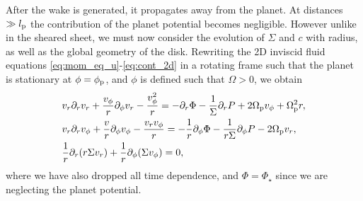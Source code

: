 After the wake is generated, it propagates away from the planet.
At distances $\gg l_{\rm p}$ the contribution of the planet potential becomes negligible.
However unlike in the sheared sheet, we must now consider the evolution of $\Sigma$ and $c$ with radius, as well as the global geometry of the disk.
Rewriting the 2D inviscid fluid equations \ref{eq:mom_eq_u}-\ref{eq:cont_2d} in a rotating frame such that the planet is stationary at $\phi=\phi_{\rm p}$, and $\phi$ is defined such that $\Omega>0$, we obtain \citep{landau1959}
\begin{align}
    &v_r \partial_r v_r + \frac{v_\phi}{r} \partial_\phi v_r - \frac{v_\phi^2}{r} = - \partial_r \Phi - \frac{1}{\Sigma} \partial_r P + 2 \Omega_{\rm p} v_\phi + \Omega_{\rm p}^2 r, \label{eq:mom_eq_u_pl} \\ 
    &v_r \partial_r v_\phi + \frac{v}{r} \partial_\phi v_\phi - \frac{v_r v_\phi}{r} = - \frac{1}{r} \partial_\phi \Phi - \frac{1}{r\Sigma} \partial_\phi P - 2 \Omega_{\rm p} v_r, \label{eq:mom_eq_v_pl} \\
    &\frac{1}{r} \partial_r (r \Sigma v_r) + \frac{1}{r} \partial_\phi (\Sigma v_\phi) = 0,
    \label{eq:cont_2d_pl}
\end{align}
where we have also dropped all time dependence, and $\Phi=\Phi_\star$ since we are neglecting the planet potential.


